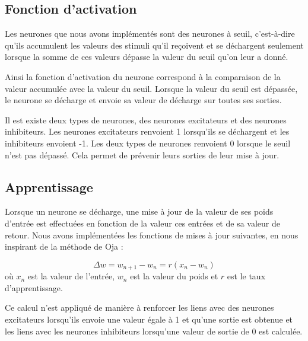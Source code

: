 \subsection{Fonction d'activation}
Les neurones que nous avons implémentés sont des neurones à seuil,
c'est-à-dire qu'ils accumulent les valeurs des stimuli qu'il reçoivent et se
déchargent seulement lorsque la somme de ces valeurs dépasse la valeur du
seuil qu'on leur a donné.

Ainsi la fonction d'activation du neurone correspond à la comparaison de la
valeur accumulée avec la valeur du seuil. Lorsque la valeur du seuil est
dépassée, le neurone se décharge et envoie sa valeur de décharge sur toutes
ses sorties.

Il est existe deux types de neurones, des neurones excitateurs et des
neurones inhibiteurs. Les neurones excitateurs renvoient 1 lorsqu'ils se
déchargent et les inhibiteurs envoient -1.
Les deux types de neurones renvoient 0 lorsque le seuil n'est pas dépassé.
Cela permet de prévenir leurs sorties de leur mise à jour.

\subsection{Apprentissage}
Lorsque un neurone se décharge, une mise à jour de la valeur de ses poids
d'entrée est effectuées en fonction de la valeur ces entrées et de sa valeur
de retour. Nous avons implémentées les fonctions de mises à jour suivantes,
en nous inspirant de la méthode de Oja :

$$\Delta w = w_{n+1} - w_{n} = r (x_n - w_n)$$
où $x_n$ est la valeur de l'entrée, $w_n$ est la valeur du poids et
$r$ est le taux d'apprentissage.

Ce calcul n'est appliqué de manière à renforcer les liens avec des neurones
excitateurs lorsqu'ils envoie une valeur égale à 1 et qu'une sortie est
obtenue et les liens avec les neurones inhibiteurs lorsqu'une valeur de sortie
de 0 est calculée.
